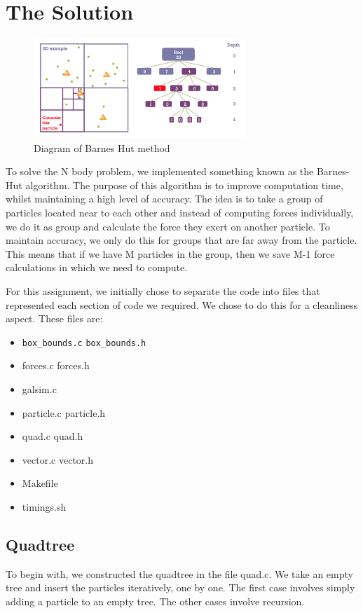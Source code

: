 \section{The Solution}
\begin{figure}[htb]
    \begin{center}
        \includegraphics[width=8cm]{../images/tree_walk.png}
        \caption{Diagram of Barnes Hut method}
    \end{center}
\end{figure}
To solve the N body problem, we implemented something known as the Barnes-Hut algorithm. The purpose of this algorithm is to improve computation time, whilst maintaining a high level of accuracy. The idea is to take a group of particles located near to each other and instead of computing forces individually, we do it as group and calculate the force they exert on another particle. To maintain accuracy, we only do this for groups that are far away from the particle. This means that if we have M particles in the group, then we save M-1 force calculations in which we need to compute.

For this assignment, we initially  chose to separate the code into files that represented each section of code we required. We chose to do this for a cleanliness aspect. These files are:
\begin{itemize}
    \item \verb|box_bounds.c| \verb|box_bounds.h|
    \item forces.c forces.h
    \item galsim.c
    \item particle.c particle.h
    \item quad.c quad.h
    \item vector.c vector.h
    \item Makefile
    \item timings.sh
\end{itemize}
\subsection{Quadtree}
To begin with, we constructed the quadtree in the file quad.c. We take an empty tree and insert the particles iteratively, one by one. The first case involves simply adding a particle to an empty tree. The other cases involve recursion.

